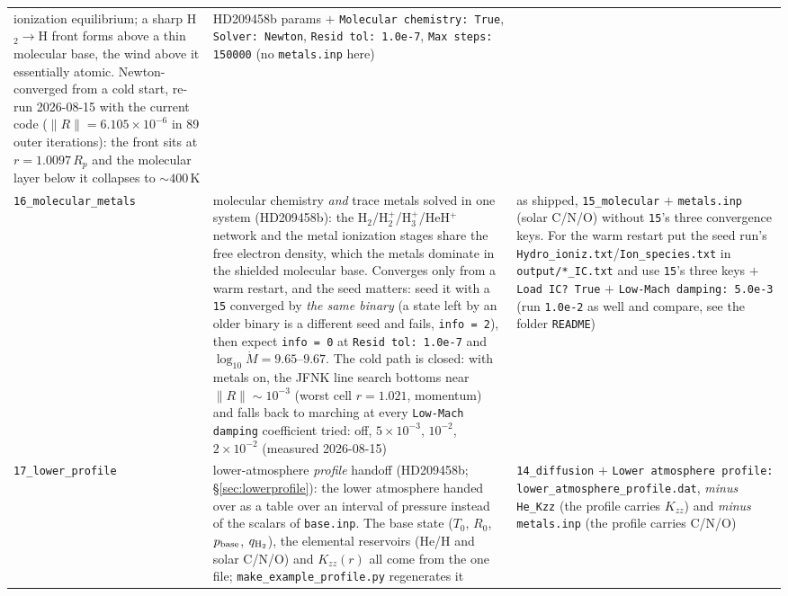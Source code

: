 \documentclass[english,a4paper]{my_memo}
\begin{document}
{\begin{longtable}{@{}lp{4.6cm}p{5.6cm}@{}}
  ionization equilibrium; a sharp H$_2\!\to$H front forms above a thin
  molecular base, the wind above it essentially atomic. Newton-converged from a
  cold start, re-run 2026-08-15 with the current code ($\|R\| =
  6.105\times10^{-6}$ in 89 outer iterations): the front sits at
  $r=1.0097\,R_p$ and the molecular layer below it collapses to ${\sim}400$\,K &
  HD209458b params $+$ \texttt{Molecular chemistry: True},
  \texttt{Solver: Newton}, \texttt{Resid tol: 1.0e-7},
  \texttt{Max steps: 150000} (no
  \texttt{metals.inp} here) \\
\texttt{16\_molecular\_metals} & molecular chemistry \emph{and} trace metals
  solved in one system (HD209458b): the H$_2$/H$_2^+$/H$_3^+$/HeH$^+$ network
  and the metal ionization stages share the free electron density, which the
  metals dominate in the shielded molecular base. Converges only from a warm
  restart, and the seed matters: seed it with a \texttt{15} converged by
  \emph{the same binary} (a state left by an older binary is a different seed
  and fails, \texttt{info = 2}), then expect \texttt{info = 0} at
  \texttt{Resid tol: 1.0e-7} and $\log_{10}\dot M = 9.65$--$9.67$. The cold path
  is closed: with metals on, the JFNK line search bottoms near
  $\|R\|\sim10^{-3}$ (worst cell $r=1.021$, momentum) and falls back to
  marching at every \texttt{Low-Mach damping} coefficient tried: off,
  $5\times10^{-3}$, $10^{-2}$, $2\times10^{-2}$ (measured 2026-08-15) &
  as shipped, \texttt{15\_molecular} $+$ \texttt{metals.inp} (solar C/N/O)
  without \texttt{15}'s three convergence keys. For the warm restart put the
  seed run's \texttt{Hydro\_ioniz.txt}/\texttt{Ion\_species.txt} in
  \texttt{output/*\_IC.txt} and use \texttt{15}'s three keys $+$
  \texttt{Load IC?\ True} $+$ \texttt{Low-Mach damping: 5.0e-3} (run
  \texttt{1.0e-2} as well and compare, see the folder \texttt{README}) \\
\texttt{17\_lower\_profile} & lower-atmosphere \emph{profile} handoff
(HD209458b; \S\ref{sec:lowerprofile}): the lower atmosphere handed over as a
table over an interval of pressure instead of the scalars of
\texttt{base.inp}. The base state ($T_0$, $R_0$, $p_{\rm base}$,
$q_{\rm H_2}$), the elemental reservoirs (He/H and solar C/N/O) and
$K_{zz}(r)$ all come from the one file; \texttt{make\_example\_profile.py}
regenerates it & \texttt{14\_diffusion} $+$ \texttt{Lower atmosphere
profile: lower\_atmosphere\_profile.dat}, \emph{minus} \texttt{He\_Kzz}
(the profile carries $K_{zz}$) and \emph{minus} \texttt{metals.inp}
(the profile carries C/N/O) \\

\end{longtable}}
\end{document}
